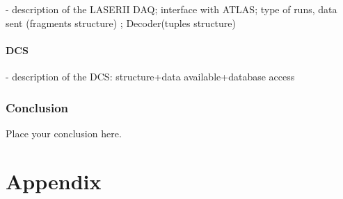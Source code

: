 \documentclass[UKenglish,texlive=2013]{\ATLASLATEXPATH atlasdoc}
\begin{document}
- description of the LASERII DAQ; interface with ATLAS; type of runs,
data sent (fragments structure) ; Decoder(tuples structure)

\subsection{DCS}

- description of the DCS: structure+data available+database access




\section{Conclusion}
\label{sec:conclusion}

Place your conclusion here.

\clearpage
\appendix
\part*{Appendix}

\end{document}
